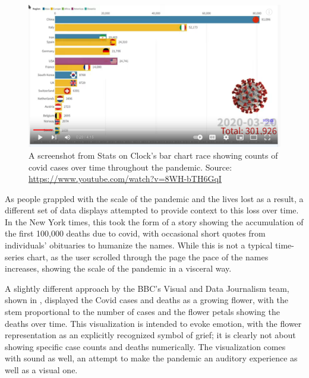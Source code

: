 \documentclass[article]{jdssv}\usepackage[]{graphicx}\usepackage[]{color}
\begin{document}
\begin{figure}
\centering
\includegraphics[width=.8\linewidth]{Figures_Web/Bar-chart-race-screenshot}
\caption{A screenshot from Stats on Clock's bar chart race showing counts of covid cases over time throughout the pandemic. Source: \url{https://www.youtube.com/watch?v=8WH-bTH6GqI}}\label{fig:barchart-race}
\end{figure}

As people grappled with the scale of the pandemic and the lives lost as a result, a different set of data displays attempted to provide context to this loss over time. In the New York times, this took the form of a story showing the accumulation of the first 100,000 deaths due to covid, with occasional short quotes from individuals' obituaries to humanize the names\citep{barryRemembering1000002020}. While this is not a typical time-series chart, as the user scrolled through the page the pace of the names increases, showing the scale of the pandemic in a visceral way.

A slightly different approach by the BBC's Visual and Data Journalism team, shown in , displayed the Covid cases and deaths as a growing flower, with the stem proportional to the number of cases and the flower petals showing the deaths over time\citep{thebbcvisualanddatajournalismteamCoronavirusHowCan2020}. This visualization is intended to evoke emotion, with the flower representation as an explicitly recognized symbol of grief; it is clearly not about showing specific case counts and deaths numerically. The visualization comes with sound as well, an attempt to make the pandemic an auditory experience as well as a visual one.
\end{document}
